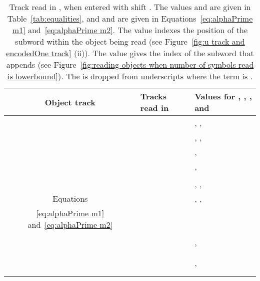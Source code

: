 \documentclass[11pt]{article} \usepackage{amsfonts,amsmath,amssymb,amsthm}
\begin{document}
\setlength{\extrarowheight}{7pt}
\begin{table*}[!ht]
\centering
\begin{tabular}{@{}c|l|l@{\;}}
 Object track  & Tracks read in  & Values for , , , and  
 \\ \hline
							&   &  ,\;\;\;\;  ,\;\;\;\;\;
\\ \cline{2-3}
							&  &   ,\;\;\;\;  ,\;\;\;\; 
 \\ \cline{2-3}
 							&  &   ,\;\;\;\; 
\\ \cline{2-3}
							&  &   ,\;\;\;\; 
							\\
							&
							\\  \cline{2-3}
	&  &  ,\;\;\;\;  ,\;\;\;\;    
\\ \cline{2-3}
Equations						&  &  ,\;\;\;\;  ,\;\;\;\;  
  \\\cline{2-3}\vspace{-4pt}
 \eqref{eq:alphaPrime m1} and~\eqref{eq:alphaPrime m2} &  &    
 \\
							&&
 \\\cline{2-3}
							&  &  ,\;\;\;\;  \\
							\cline{2-3}\vspace{-4pt}
							&  	&  
   \\ 
							&&
   \\\cline{2-3}
							&  & ,\;\;\;\; \\\cline{2-3}\vspace{-4pt}
							&  &  \\
							&&\\ 
\hline
\end{tabular}
\caption{Track read in , when entered with shift . The values  and  are given in Table~\ref{tab:equalities}, and  and  are given in Equations~\eqref{eq:alphaPrime m1} and~\eqref{eq:alphaPrime m2}. The value  indexes the position of the  subword within the object being read (see Figure~\ref{fig:u track and encodedOne track} (ii)). The value  gives the index of the  subword that appends  (see Figure~\ref{fig:reading objects when number of symbols read is lowerbound}). The  is dropped from underscripts where the term is  .}\label{tab:Tracks in u for Case 2b}
\end{table*}
\end{document}
